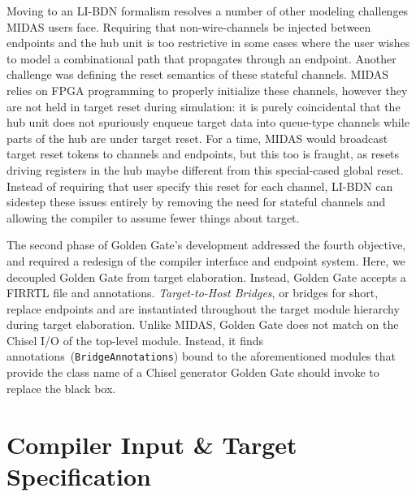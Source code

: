 Moving to an LI-BDN formalism resolves a number of other modeling
challenges MIDAS users face.  Requiring that non-wire-channels be injected
between endpoints and the hub unit is too restrictive in some cases where
the user wishes to model a combinational path that propagates through an
endpoint. Another challenge was defining the reset semantics of these
stateful channels.  MIDAS relies on FPGA programming to properly initialize
these channels, however they are not held in target reset during
simulation: it is purely coincidental that the hub unit does not
spuriously enqueue target data into queue-type channels while parts of the
hub are under target reset. For a time, MIDAS would broadcast target reset
tokens to channels and endpoints, but this too is fraught, as resets driving
registers in the hub maybe different from this special-cased global reset.
Instead of requiring that user specify this reset for each channel, LI-BDN
can sidestep these issues entirely by removing the need for stateful
channels and allowing the compiler to assume fewer things about target.

The second phase of Golden Gate's development addressed the fourth objective,
and required a redesign of the compiler interface and endpoint system. Here, we
decoupled Golden Gate from target elaboration. Instead, Golden Gate accepts a FIRRTL
file and annotations. \emph{Target-to-Host Bridges}, or bridges for
short, replace endpoints and are instantiated throughout the target module
hierarchy during target elaboration. Unlike MIDAS, Golden Gate does not match
on the Chisel I/O of the top-level module. Instead, it finds annotations~(\texttt{BridgeAnnotations}) bound to the aforementioned modules that provide the
class name of a Chisel generator Golden Gate should invoke to replace the black
box.

\section{Compiler Input \& Target Specification}

